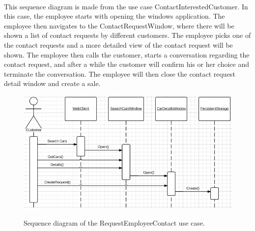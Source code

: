 \\
This sequence diagram is made from the use case ContactInterestedCustomer. In this case, the employee starts with opening the windows application. The employee then navigates to the ContactRequestWindow, where there will be shown a list of contact requests by different customers. The employee picks one of the contact requests and a more detailed view of the contact request will be shown. The employee then calls the customer, starts a conversation regarding the contact request, and after a while the customer will confirm his or her choice and terminate the conversation. The employee will then close the contact request detail window and create a sale.
\\
\begin{figure}[H]
	\centering
		\includegraphics[width=\textwidth]{Figures/SequenceDiagram-RequestEmployeeContact}\\
	\caption{Sequence diagram of the RequestEmployeeContact use case.}
  \label{fig:SequenceDiagram-RequestEmployeeContact}
\end{figure}
\\

\\
